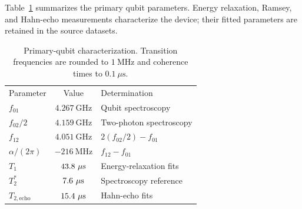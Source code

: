 Table~\ref{tab:device-parameters} summarizes the primary qubit parameters.
Energy relaxation, Ramsey, and Hahn-echo measurements characterize the device;
their fitted parameters are retained in the source datasets.

\begin{table}[!tp]
    \caption{Primary-qubit characterization.
    Transition frequencies are rounded to $1~\mathrm{MHz}$ and
    coherence times to $0.1~\mu\mathrm{s}$.}
    \label{tab:device-parameters}
    \begin{ruledtabular}
        \begin{tabular}{lcl}
            Parameter & Value & Determination \\
            $f_{01}$ & $4.267~\mathrm{GHz}$ & Qubit spectroscopy \\
            $f_{02}/2$ & $4.159~\mathrm{GHz}$ & Two-photon spectroscopy \\
            $f_{12}$ & $4.051~\mathrm{GHz}$ & $2(f_{02}/2)-f_{01}$ \\
            $\alpha/(2\pi)$ & $-216~\mathrm{MHz}$ & $f_{12}-f_{01}$ \\
            $T_1$ & $43.8~\mu\mathrm{s}$ & Energy-relaxation fits \\
            $T_2^*$ & $7.6~\mu\mathrm{s}$ & Spectroscopy reference \\
            $T_{2,\mathrm{echo}}$ & $15.4~\mu\mathrm{s}$ & Hahn-echo fits \\
        \end{tabular}
    \end{ruledtabular}
\end{table}

